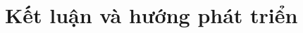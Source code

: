 \def\baselinestretch{1}
\chapter{Kết luận và hướng phát triển}
\ifpdf
    \graphicspath{{Conclusions/ConclusionsFigs/PNG/}{Conclusions/ConclusionsFigs/PDF/}{Conclusions/ConclusionsFigs/}}
\else
    \graphicspath{{Conclusions/ConclusionsFigs/EPS/}{Conclusions/ConclusionsFigs/}}
\fi

\def\baselinestretch{1.66}




